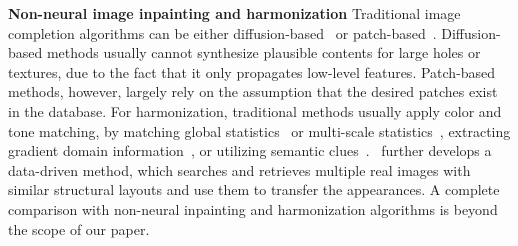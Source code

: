\noindent\textbf{Non-neural image inpainting and harmonization} Traditional image completion algorithms can be either diffusion-based~\cite{bertalmio2000image,elad2005simultaneous} or patch-based~\cite{bertalmio2003simultaneous,barnes2009patchmatch}. Diffusion-based methods usually cannot synthesize plausible contents for large holes or textures, due to the fact that it only propagates low-level features. Patch-based methods, however, largely rely on the assumption that the desired patches exist in the database. For harmonization, traditional methods usually apply color and tone matching, by matching global statistics~\cite{reinhard2001color} or multi-scale statistics~\cite{sunkavalli2010multi}, extracting gradient domain information~\cite{perez2003poisson,tao2010error}, or utilizing semantic clues~\cite{tsai2016sky}.~\cite{johnson2011cg2real} further develops a data-driven method, which searches and retrieves multiple real images with similar structural layouts and use them to transfer the appearances. A complete comparison with non-neural inpainting and harmonization algorithms is beyond the scope of our paper.
